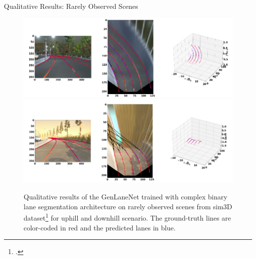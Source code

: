 \documentclass[aspectratio=169]{beamer}
\begin{document}
\begin{frame}{Qualitative Results: Rarely Observed Scenes}

 \begin{figure}[h]
      \caption{Qualitative results of the GenLaneNet trained with complex binary lane segmentation architecture on rarely observed scenes from sim3D dataset\footcite{guo2020gen} for uphill and downhill scenario. The ground-truth lines are color-coded in red and the predicted lanes in blue.}
        \centering
        
        \includegraphics[scale=0.2]{images/uphill_rare.png} 
        \hfill
        \includegraphics[scale=0.2]{images/downhill_rare.png}
       
        \end{figure}
    
\end{frame}
\end{document}
